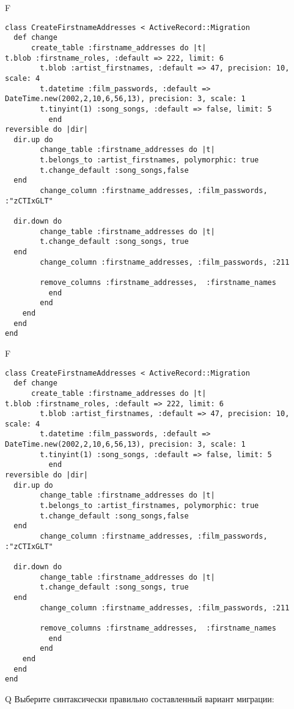F
\begin{verbatim}
class CreateFirstnameAddresses < ActiveRecord::Migration
  def change
	  create_table :firstname_addresses do |t|
t.blob :firstname_roles, :default => 222, limit: 6
		t.blob :artist_firstnames, :default => 47, precision: 10, scale: 4
		t.datetime :film_passwords, :default => DateTime.new(2002,2,10,6,56,13), precision: 3, scale: 1
		t.tinyint(1) :song_songs, :default => false, limit: 5
		  end
reversible do |dir|
  dir.up do
		change_table :firstname_addresses do |t|
		t.belongs_to :artist_firstnames, polymorphic: true
 		t.change_default :song_songs,false
  end
 		change_column :firstname_addresses, :film_passwords, :"zCTIxGLT"
   
  dir.down do
		change_table :firstname_addresses do |t|
		t.change_default :song_songs, true
  end
 		change_column :firstname_addresses, :film_passwords, :211
   
		remove_columns :firstname_addresses,  :firstname_names 
	      end
	    end
    end 
  end
end

\end{verbatim}

F
\begin{verbatim}
class CreateFirstnameAddresses < ActiveRecord::Migration
  def change
	  create_table :firstname_addresses do |t|
t.blob :firstname_roles, :default => 222, limit: 6
		t.blob :artist_firstnames, :default => 47, precision: 10, scale: 4
		t.datetime :film_passwords, :default => DateTime.new(2002,2,10,6,56,13), precision: 3, scale: 1
		t.tinyint(1) :song_songs, :default => false, limit: 5
		  end
reversible do |dir|
  dir.up do
		change_table :firstname_addresses do |t|
		t.belongs_to :artist_firstnames, polymorphic: true
 		t.change_default :song_songs,false
  end
 		change_column :firstname_addresses, :film_passwords, :"zCTIxGLT"
   
  dir.down do
		change_table :firstname_addresses do |t|
		t.change_default :song_songs, true
  end
 		change_column :firstname_addresses, :film_passwords, :211
   
		remove_columns :firstname_addresses,  :firstname_names 
	      end
	    end
    end 
  end
end

\end{verbatim}

Q
Выберите синтаксически правильно составленный вариант миграции:

